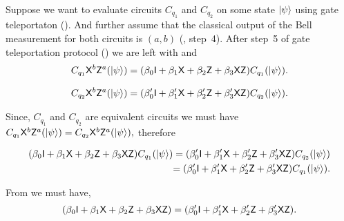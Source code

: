 Suppose we want to evaluate circuits $C_{q_1}$ and $C_{q_2}$ on some state ${\lvert}\psi\rangle$ using gate teleportaton (). And further assume that the classical output of the Bell measurement for both circuits is  $(a,b)$ (, step~4). After step~5 of  gate teleportation protocol () we are left with   and 
\begin{equation}
\label{lemma:1qubit:eq1}
\begin{aligned}
 C_{q_1} {\sf X}^b {\sf Z}^a({\lvert}\psi\rangle)=(\beta_0 {\sf I}+\beta_1 {\sf X}+\beta_2 {\sf Z}+\beta_3 {\sf X} {\sf Z})  C_{q_1} ({\lvert}\psi\rangle).\\
 \end{aligned}
\end{equation}

\begin{equation}
\label{lemma:1qubit:eq2}
\begin{aligned}
 C_{q_2}{\sf X}^b {\sf Z}^a({\lvert}\psi\rangle)=(\beta_0^\prime {\sf I}+\beta_1^\prime {\sf X}+\beta_2^\prime {\sf Z}+\beta_3^\prime {\sf X} {\sf Z})  C_{q_2}({\lvert}\psi\rangle).
 \end{aligned}
\end{equation}

Since, $C_{q_1}$ and $C_{q_2}$ are equivalent circuits we must have $C_{q_1} {\sf X}^b {\sf Z}^a({\lvert}\psi\rangle)=C_{q_2} {\sf X}^b {\sf Z}^a({\lvert}\psi\rangle),$ therefore

\begin{equation}
\label{lemma:1qubit:eq3}
\begin{aligned}
(\beta_0 {\sf I}+\beta_1 {\sf X}+\beta_2 {\sf Z}+\beta_3 {\sf X} {\sf Z})  C_{q_1} ({\lvert}\psi\rangle)=(\beta_0^\prime {\sf I}+\beta_1^\prime {\sf X}+\beta_2^\prime {\sf Z}+\beta_3^\prime {\sf X} {\sf Z})  C_{q_2} ({\lvert}\psi\rangle)\\
=(\beta_0^\prime {\sf I}+\beta_1^\prime {\sf X}+\beta_2^\prime {\sf Z}+\beta_3^\prime {\sf X} {\sf Z})  C_{q_1}({\lvert}\psi\rangle).\\
\end{aligned}
\end{equation}


From  we must have,
\begin{equation}
\label{lemma:1qubit:eq4}
\begin{aligned}
(\beta_0 {\sf I}+\beta_1 {\sf X}+\beta_2 {\sf Z}+\beta_3 {\sf X} {\sf Z}) =(\beta_0^\prime {\sf I}+\beta_1^\prime {\sf X}+\beta_2^\prime {\sf Z}+\beta_3^\prime {\sf X} {\sf Z}).\\
\end{aligned}
\end{equation}

